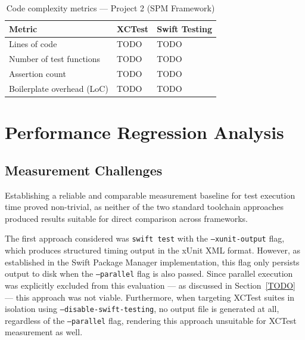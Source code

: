 \begin{table}[ht]
    \centering
    \caption{Code complexity metrics --- Project 2 (SPM Framework)}
    \label{tab:complexity-project2}
    \begin{tabular}{lll}
        \hline
        \textbf{Metric}            & \textbf{XCTest} & \textbf{Swift Testing} \\
        \hline
        Lines of code              & TODO            & TODO                   \\
        Number of test functions   & TODO            & TODO                   \\
        Assertion count            & TODO            & TODO                   \\
        Boilerplate overhead (LoC) & TODO            & TODO                   \\
        \hline
    \end{tabular}
\end{table}


\section{Performance Regression Analysis}

\subsection{Measurement Challenges}

Establishing a reliable and comparable measurement baseline for test execution time
proved non-trivial, as neither of the two standard toolchain approaches produced
results suitable for direct comparison across frameworks.

The first approach considered was \texttt{swift test} with the
\texttt{--xunit-output} flag, which produces structured timing output in the xUnit
XML format. However, as established in the Swift Package Manager implementation,
this flag only persists output to disk when the \texttt{--parallel} flag is also
passed. Since parallel execution was explicitly excluded from this evaluation --- as
discussed in Section~\ref{TODO} --- this approach was not viable. Furthermore, when
targeting XCTest suites in isolation using \texttt{--disable-swift-testing}, no
output file is generated at all, regardless of the \texttt{--parallel} flag,
rendering this approach unsuitable for XCTest measurement as well.

